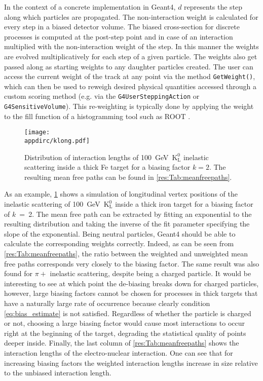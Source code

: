 %
In the context of a concrete implementation in Geant4, $d$ represents the step along which particles are propagated. The non-interaction weight is calculated for every step in a biased detector volume. The biased cross-section for discrete processes is computed at the post-step point and in case of an interaction multiplied with the non-interaction weight of the step. In this manner the weights are evolved multiplicatively for each step of a given particle. The weights also get passed along as starting weights to any daughter particles created. The user can access the current weight of the track at any point via the method \verb|GetWeight()|, which can then be used to reweigh desired physical quantities accessed through a custom scoring method (e.g. via the \verb|G4UserSteppingAction| or \verb|G4SensitiveVolume|). This re-weighting is typically done by applying the weight to the fill function of a histogramming tool such as ROOT \cite{root}.

\begin{figure}[htb]
  \centering
  \texttt{[image: \\appdirc/klong.pdf]}
  \caption[Distribution of interaction lengths of $\mathrm{K^0_L}$ inelastic scattering.] {Distribution of interaction lengths of 100~GeV~$\mathrm{K^0_L}$ inelastic scattering inside a thick Fe target for a biasing factor $k=2$. The resulting mean free paths can be found in \ref{res:Tab:meanfreepaths}.}
  \label{res:fig:klong}
\end{figure}

As an example, \ref{res:fig:klong} shows a simulation of longitudinal vertex positions of the inelastic scattering of 100~GeV~$\mathrm{K^0_L}$ inside a thick iron target for a biasing factor of $k$~=~2. The mean free path can be extracted by fitting an exponential to the resulting distribution and taking the inverse of the fit parameter specifying the slope of the exponential. Being neutral particles, Geant4 should be able to calculate the corresponding weights correctly. Indeed, as can be seen from \ref{res:Tab:meanfreepaths}, the ratio between the weighted and unweighted mean free paths corresponds very closely to the biasing factor. The same result was also found for $\pi+$ inelastic scattering, despite being a charged particle. It would be interesting to see at which point the de-biasing breaks down for charged particles, however, large biasing factors cannot be chosen for processes in thick targets that have a naturally large rate of occurrence because clearly condition \ref{eq:bias_estimate} is not satisfied. Regardless of whether the particle is charged or not, choosing a large biasing factor would cause most interactions to occur right at the beginning of the target, degrading the statistical quality of points deeper inside. Finally, the last column of \ref{res:Tab:meanfreepaths} shows the interaction lengths of the electro-nuclear interaction. One can see that for increasing biasing factors the weighted interaction lengths increase in size relative to the unbiased interaction length.


